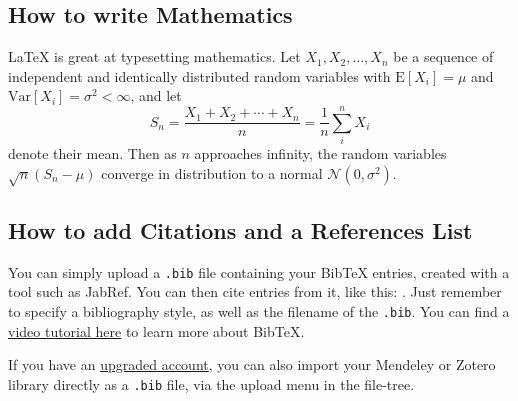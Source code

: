 \documentclass{article}
\begin{document}
\subsection{How to write Mathematics}

\LaTeX{} is great at typesetting mathematics. Let $X_1, X_2, \ldots, X_n$ be a sequence of independent and identically distributed random variables with $\text{E}[X_i] = \mu$ and $\text{Var}[X_i] = \sigma^2 < \infty$, and let
\[S_n = \frac{X_1 + X_2 + \cdots + X_n}{n}
      = \frac{1}{n}\sum_{i}^{n} X_i\]
denote their mean. Then as $n$ approaches infinity, the random variables $\sqrt{n}(S_n - \mu)$ converge in distribution to a normal $\mathcal{N}(0, \sigma^2)$.

\subsection{How to add Citations and a References List}

You can simply upload a \verb|.bib| file containing your BibTeX entries, created with a tool such as JabRef. You can then cite entries from it, like this: \cite{greenwade93}. Just remember to specify a bibliography style, as well as the filename of the \verb|.bib|. You can find a \href{https://www.overleaf.com/help/97-how-to-include-a-bibliography-using-bibtex}{video tutorial here} to learn more about BibTeX.

If you have an \href{https://www.overleaf.com/user/subscription/plans}{upgraded account}, you can also import your Mendeley or Zotero library directly as a \verb|.bib| file, via the upload menu in the file-tree.




\end{document}
